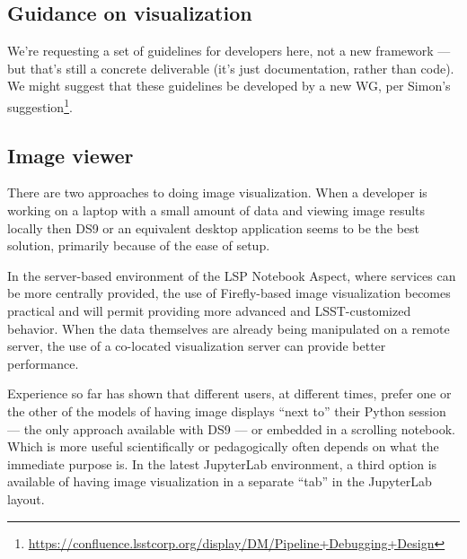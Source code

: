 \documentclass[DM,authoryear,toc,lsstdraft]{lsstdoc}
\begin{document}

\subsection{Guidance on visualization}


We're requesting a set of guidelines for developers here, not a new framework
--- but that's still a concrete deliverable (it's just documentation, rather
than code). We might suggest that these guidelines be developed by a new WG,
per Simon's
suggestion\footnote{\url{https://confluence.lsstcorp.org/display/DM/Pipeline+Debugging+Design}}.

\subsection{Image viewer}


There are two approaches to doing image visualization.
When a developer is working on a laptop with a
small amount of data and viewing image results locally then DS9 or an equivalent desktop application seems
to be the best solution, primarily because of the ease of setup.

In the server-based environment of the LSP Notebook Aspect, where services can be more centrally provided,
the use of Firefly-based image visualization becomes practical and will permit providing more advanced
and LSST-customized behavior.
When the data themselves are already being manipulated on a remote server,
the use of a co-located visualization server can provide better performance.

Experience so far has shown that different users, at different times, prefer one or the other of the models of having image displays ``next to'' their Python session --- the only approach available with DS9 --- or embedded in a scrolling notebook.
Which is more useful scientifically or pedagogically often depends on what the immediate purpose is.
In the latest JupyterLab environment, a third option is available of having image visualization in a separate ``tab'' in the JupyterLab layout.
\end{document}
